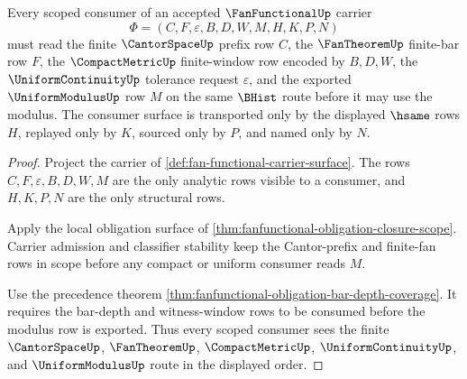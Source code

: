 \begin{theorem}
\label{thm:fanfunctional-scoped-consumer-route}
Every scoped consumer of an accepted $\FanFunctionalUp$ carrier
$$
\Phi=(C,F,\varepsilon,B,D,W,M,H,K,P,N)
$$
must read the finite $\CantorSpaceUp$ prefix row $C$, the $\FanTheoremUp$ finite-bar row $F$, the $\CompactMetricUp$ finite-window row encoded by $B,D,W$, the $\UniformContinuityUp$ tolerance request $\varepsilon$, and the exported $\UniformModulusUp$ row $M$ on the same $\BHist$ route before it may use the modulus. The consumer surface is transported only by the displayed $\hsame$ rows $H$, replayed only by $K$, sourced only by $P$, and named only by $N$.
\end{theorem}
\begin{proof}
Project the carrier of \autoref{def:fan-functional-carrier-surface}. The rows $C,F,\varepsilon,B,D,W,M$ are the only analytic rows visible to a consumer, and $H,K,P,N$ are the only structural rows.

Apply the local obligation surface of \autoref{thm:fanfunctional-obligation-closure-scope}. Carrier admission and classifier stability keep the Cantor-prefix and finite-fan rows in scope before any compact or uniform consumer reads $M$.

Use the precedence theorem \autoref{thm:fanfunctional-obligation-bar-depth-coverage}. It requires the bar-depth and witness-window rows to be consumed before the modulus row is exported. Thus every scoped consumer sees the finite $\CantorSpaceUp$, $\FanTheoremUp$, $\CompactMetricUp$, $\UniformContinuityUp$, and $\UniformModulusUp$ route in the displayed order.
\end{proof}

